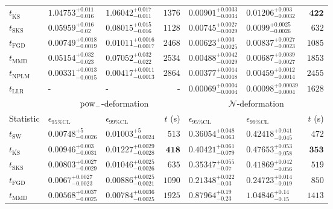 \begin{tabular}{l|llr|llr}
	$t_{\overline{\mathrm{KS}}}$ & $1.04753_{-0.016}^{+0.011}$ & $1.06042_{-0.011}^{+0.017}$ & $1376$ & $0.00901_{-0.0034}^{+0.0033}$ & $0.01206_{-0.0032}^{+0.003}$ & ${\mathbf{422}}$ \\
	$t_{\mathrm{SKS}}$ & $0.05959_{-0.02}^{+0.016}$ & $0.08015_{-0.016}^{+0.015}$ & $1128$ & $0.00745_{-0.0029}^{+0.0027}$ & $0.0099_{-0.0026}^{+0.0025}$ & $632$ \\
	$t_{\mathrm{FGD}}$ & ${\mathbf{0.00749_{-0.0019}^{+0.0018}}}$ & ${\mathbf{0.01011_{-0.0017}^{+0.0016}}}$ & $2468$ & $0.00623_{-0.0025}^{+0.003}$ & $0.00837_{-0.0023}^{+0.0027}$ & $1085$ \\
	$t_{\mathrm{MMD}}$ & $0.05154_{-0.023}^{+0.032}$ & $0.07052_{-0.022}^{+0.032}$ & $2534$ & ${\mathbf{0.00488_{-0.0029}^{+0.0042}}}$ & ${\mathbf{0.00687_{-0.0027}^{+0.0039}}}$ & $1853$ \\
\rowcolor{red!35}	$t_{\mathrm{NPLM}}$ & $0.00331_{-0.0015}^{+0.0013}$ & $0.00417_{-0.0013}^{+0.0011}$ & $2864$ & $0.00377_{-0.0018}^{+0.0014}$ & $0.00459_{-0.0014}^{+0.0012}$ & $2455$ \\
	$t_{\mathrm{LLR}}$ & - & - & - & $0.00069_{-0.0004}^{+0.0004}$ & $0.00098_{-0.0004}^{+0.00039}$ & $1628$ \\
	\toprule
	\multicolumn{1}{c}{} & \multicolumn{3}{c}{$\rm{pow}_{-}$-deformation} & \multicolumn{3}{c}{$\mathcal{N}$-deformation} \\
	Statistic & $\epsilon_{95\%\mathrm{CL}}$ & $\epsilon_{99\%\mathrm{CL}}$ & $t$ (s) & $\epsilon_{95\%\mathrm{CL}}$ & $\epsilon_{99\%\mathrm{CL}}$ & $t$ (s) \\
	\midrule
	$t_{\mathrm{SW}}$ & $0.00748_{-0.0026}^{+5}$ & $0.01003_{-0.0024}^{+5}$ & $513$ & $0.36054_{-0.063}^{+0.048}$ & $0.42418_{-0.045}^{+0.041}$ & $472$ \\
	$t_{\overline{\mathrm{KS}}}$ & $0.00946_{-0.0031}^{+0.003}$ & $0.01227_{-0.0028}^{+0.0029}$ & ${\mathbf{418}}$ & $0.40421_{-0.079}^{+0.061}$ & $0.47653_{-0.058}^{+0.053}$ & ${\mathbf{353}}$ \\
	$t_{\mathrm{SKS}}$ & $0.00803_{-0.0029}^{+0.0027}$ & $0.01046_{-0.0026}^{+0.0025}$ & $635$ & $0.35347_{-0.07}^{+0.055}$ & $0.41869_{-0.056}^{+0.042}$ & $519$ \\
	$t_{\mathrm{FGD}}$ & $0.0067_{-0.0023}^{+0.0027}$ & $0.00886_{-0.0021}^{+0.0025}$ & $1090$ & ${\mathbf{0.21348_{-0.03}^{+0.022}}}$ & ${\mathbf{0.24723_{-0.019}^{+0.014}}}$ & $850$ \\
	$t_{\mathrm{MMD}}$ & ${\mathbf{0.00568_{-0.0025}^{+0.0037}}}$ & ${\mathbf{0.00784_{-0.0025}^{+0.0036}}}$ & $1925$ & $0.87964_{-0.23}^{+0.19}$ & $1.04846_{-0.15}^{+0.14}$ & $1413$ \\

\end{tabular}
